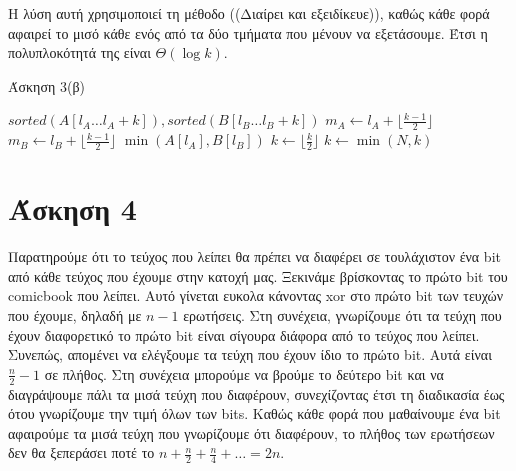 \documentclass[11pt,a4paper]{book}
\begin{document}
Η λύση αυτή χρησιμοποιεί τη μέθοδο ((Διαίρει και εξειδίκευε)), καθώς κάθε φορά αφαιρεί το μισό κάθε ενός από τα δύο τμήματα που μένουν να εξετάσουμε. Έτσι η πολυπλοκότητά της είναι $\Theta( \log k )$.

\begin{algorithm}[H]
\caption{\textgreek{Άσκηση 3(β)}}
\begin{algorithmic}[1]
\Require $sorted(A[l_A \dots l_A + k]), sorted(B[l_B \dots l_B + k])$
	\State $m_A \gets l_A + \lfloor \frac{k - 1}{2} \rfloor$
	\State $m_B \gets l_B + \lfloor \frac{k - 1}{2} \rfloor$
        \State \Return $\min( A[ l_A ], B[ l_B ] )$
    \EndIf
    \State $k \gets \lfloor \frac{k}{2} \rfloor$
        \State \Return {}
    \EndIf
    \State \Return {}
\EndProcedure
{}
	\State $k \gets \min(N, k)$
	\State \Return {}
\EndProcedure
\end{algorithmic}
\end{algorithm}

        
\section*{Άσκηση 4}
Παρατηρούμε ότι το τεύχος που λείπει θα πρέπει να διαφέρει σε τουλάχιστον ένα \textlatin{bit} από κάθε τεύχος που έχουμε στην κατοχή μας. Ξεκινάμε βρίσκοντας το πρώτο \textlatin{bit} του \textlatin{comicbook} που λείπει. Αυτό γίνεται ευκολα κάνοντας \textlatin{xor} στο πρώτο \textlatin{bit} των τευχών που έχουμε, δηλαδή με $n - 1$ ερωτήσεις. Στη συνέχεια, γνωρίζουμε ότι τα τεύχη που έχουν διαφορετικό το πρώτο \textlatin{bit} είναι σίγουρα διάφορα από το τεύχος που λείπει. Συνεπώς, απομένει να ελέγξουμε τα τεύχη που έχουν ίδιο το πρώτο \textlatin{bit}. Αυτά είναι $\frac{n}{2} - 1$ σε πλήθος. Στη συνέχεια μπορούμε να βρούμε το δεύτερο \textlatin{bit} και να διαγράψουμε πάλι τα μισά τεύχη που διαφέρουν, συνεχίζοντας έτσι τη διαδικασία έως ότου γνωρίζουμε την τιμή όλων των \textlatin{bits}. Καθώς κάθε φορά που μαθαίνουμε ένα \textlatin{bit} αφαιρούμε τα μισά τεύχη που γνωρίζουμε ότι διαφέρουν, το πλήθος των ερωτήσεων δεν θα ξεπεράσει ποτέ το $n + \frac{n}{2} + \frac{n}{4} + \dots = 2n$.
\end{document}
